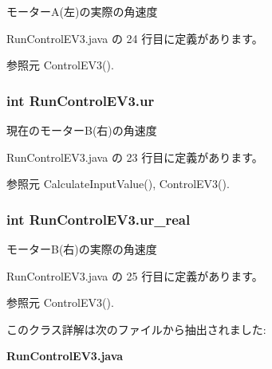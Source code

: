 モーター\-A(左)の実際の角速度 



 Run\-Control\-E\-V3.\-java の 24 行目に定義があります。



参照元 Control\-E\-V3().

\subsubsection[{ur}]{\setlength{\rightskip}{0pt plus 5cm}int Run\-Control\-E\-V3.\-ur\hspace{0.3cm}{\ttfamily [static]}}\label{class_run_control_e_v3_ae74b60d3e2a26e4982778d8c2bf37aee}


現在のモーター\-B(右)の角速度 



 Run\-Control\-E\-V3.\-java の 23 行目に定義があります。



参照元 Calculate\-Input\-Value(), Control\-E\-V3().

\subsubsection[{ur\-\_\-real}]{\setlength{\rightskip}{0pt plus 5cm}int Run\-Control\-E\-V3.\-ur\-\_\-real\hspace{0.3cm}{\ttfamily [static]}}\label{class_run_control_e_v3_a67525ab959466f99029c7d8659d2f5e4}


モーター\-B(右)の実際の角速度 



 Run\-Control\-E\-V3.\-java の 25 行目に定義があります。



参照元 Control\-E\-V3().



このクラス詳解は次のファイルから抽出されました\-:\begin{DoxyCompactItemize}
\item 
{\bf Run\-Control\-E\-V3.\-java}\end{DoxyCompactItemize}
